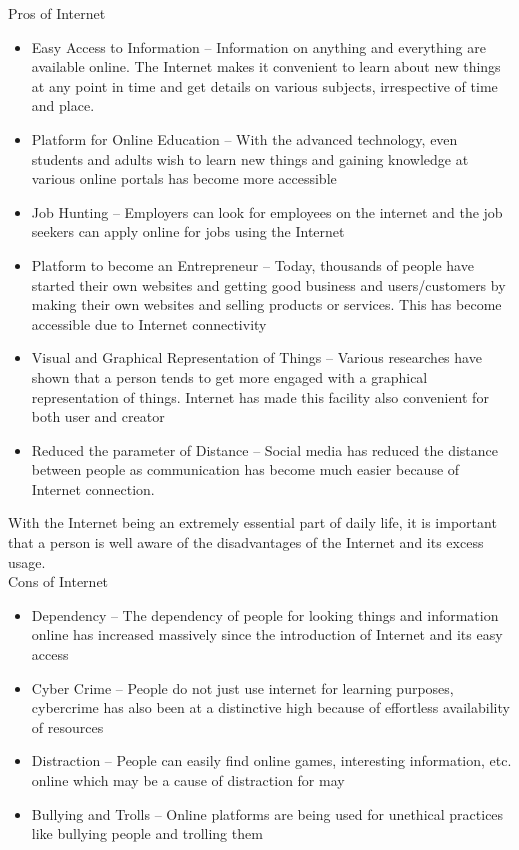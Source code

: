 \documentclass[11pt,a4paper,twoside]{article}
\begin{document}
Pros of Internet
\begin{itemize}
    \item Easy Access to Information – Information on anything and everything are available online. The Internet makes it convenient to learn about new things at any point in time and get details on various subjects, irrespective of time and place.
\item Platform for Online Education – With the advanced technology, even students and adults wish to learn new things and gaining knowledge at various online portals has become more accessible
\item Job Hunting – Employers can look for employees on the internet and the job seekers can apply online for jobs using the Internet
\item Platform to become an Entrepreneur – Today, thousands of people have started their own websites and getting good business and users/customers by making their own websites and selling products or services. This has become accessible due to Internet connectivity
\item Visual and Graphical Representation of Things – Various researches have shown that a person tends to get more engaged with a graphical representation of things. Internet has made this facility also convenient for both user and creator 
\item Reduced the parameter of Distance – Social media has reduced the distance between people as communication has become much easier because of Internet connection.
\end{itemize}
With the Internet being an extremely essential part of daily life, it is important that a person is well aware of the disadvantages of the Internet and its excess usage.\\
Cons of Internet
\begin{itemize}
    \item Dependency – The dependency of people for looking things and information online has increased massively since the introduction of Internet and its easy access
\item Cyber Crime – People do not just use internet for learning purposes, cybercrime has also been at a distinctive high because of effortless availability of resources
\item Distraction – People can easily find online games, interesting information, etc. online which may be a cause of distraction for may
\item Bullying and Trolls – Online platforms are being used for unethical practices like bullying people and trolling them
\end{itemize}
\end{document}
